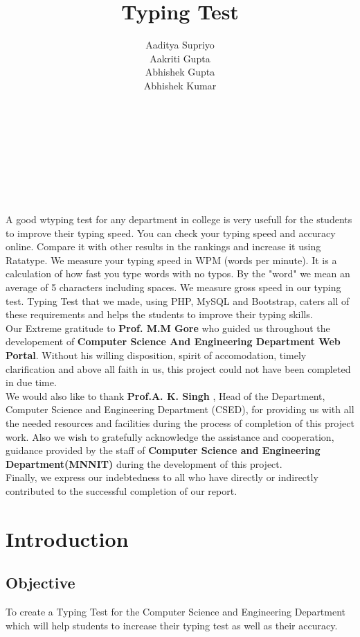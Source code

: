 \documentclass{mnnit}
\begin{document}
\title{Typing Test}
\author{Aaditya Supriyo\\Aakriti Gupta\\Abhishek Gupta\\Abhishek Kumar}\\ ~ \\ ~ \\~\\~\\~\\
\beforepreface
{}
A good wtyping test for any department in college is very usefull for the students to improve their typing speed. You can check your typing speed and accuracy online. Compare it with other results in the rankings and increase it using Ratatype. We measure your typing speed in WPM (words per minute). It is a calculation of how fast you type words with no typos. By the "word" we mean an average of 5 characters including spaces. We measure gross speed in our typing test. Typing Test that we made, using PHP, MySQL and Bootstrap, caters all of these requirements and helps the students to improve their typing skills.\\

Our Extreme gratitude to \textbf{Prof. M.M Gore} who guided us throughout the developement of \textbf{Computer Science And Engineering Department Web Portal}. Without his willing disposition, spirit of accomodation, timely clarification and above all faith in us, this project could not have been completed in due time.\\
We would also like to thank \textbf{Prof.A. K. Singh }, Head of the Department, Computer Science and Engineering Department (CSED), for providing us with all the needed resources and facilities during the process of completion of this project work.
Also we wish to gratefully acknowledge the assistance and cooperation, guidance provided by the staff of \textbf{Computer Science and Engineering Department(MNNIT)} during the development of this project. \\
Finally, we express our indebtedness to all who have directly or indirectly contributed to the successful completion of our report.
\afterpreface

\chapter{Introduction}

\section{Objective}
To create a Typing Test for the Computer Science and Engineering Department which will help students to increase their typing test as well as their accuracy.
\end{document}
